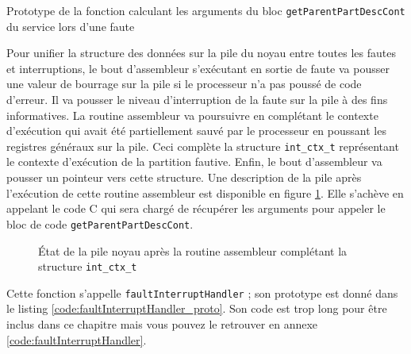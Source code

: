 		\begin{listing}[!b]
			\caption{Prototype de la fonction calculant les arguments du bloc \texttt{getParentPartDescCont} du service lors d'une faute}
			\label{code:faultInterruptHandler_proto}
		\end{listing}

		Pour unifier la structure des données sur la pile du noyau entre toutes les fautes et interruptions, le bout d'assembleur s'exécutant en sortie de faute va pousser une valeur de bourrage sur la pile si le processeur n'a pas poussé de code d'erreur. Il va pousser le niveau d'interruption de la faute sur la pile à des fins informatives. La routine assembleur va poursuivre en complétant le contexte d'exécution qui avait été partiellement sauvé par le processeur en poussant les registres généraux sur la pile. Ceci complète la structure \texttt{int\_ctx\_t} représentant le contexte d'exécution de la partition fautive. Enfin, le bout d'assembleur va pousser un pointeur vers cette structure. Une description de la pile après l'exécution de cette routine assembleur est disponible en figure \ref{fig:interrupt_stack}. Elle s'achève en appelant le code C qui sera chargé de récupérer les arguments pour appeler le bloc de code \texttt{getParentPartDescCont}.

		\begin{figure}[!ht]
			
			\caption{État de la pile noyau après la routine assembleur complétant la structure \texttt{int\_ctx\_t}}
			\label{fig:interrupt_stack}
		\end{figure}

		Cette fonction s'appelle \texttt{faultInterruptHandler} ; son prototype est donné dans le listing \ref{code:faultInterruptHandler_proto}. Son code est trop long pour être inclus dans ce chapitre mais vous pouvez le retrouver en annexe \ref{code:faultInterruptHandler}.

